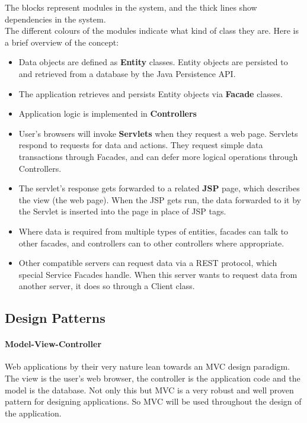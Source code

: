 The blocks represent modules in the system, and the thick lines show dependencies in the system.\\
The different colours of the modules indicate what kind of class they are.
Here is a brief overview of the concept:
\begin{itemize}
\item Data objects are defined as \textbf{Entity} classes. Entity objects are persisted to and retrieved from a database by the Java Persistence API.
\item The application retrieves and persists Entity objects via \textbf{Facade} classes.
\item Application logic is implemented in \textbf{Controllers}
\item User's browsers will invoke \textbf{Servlets} when they request a web page. Servlets respond to requests for data and actions. They request simple data transactions through Facades, and can defer more logical operations through Controllers.
\item The servlet's response gets forwarded to a related \textbf{JSP} page, which describes the view (the web page). When the JSP gets run, the data forwarded to it by the Servlet is inserted into the page in place of JSP tags.
\item Where data is required from multiple types of entities, facades can talk to other facades, and controllers can to other controllers where appropriate.
\item Other compatible servers can request data via a REST protocol, which special Service Facades handle. When this server wants to request data from another server, it does so through a Client class.
\end{itemize}

\clearpage
\subsection{Design Patterns}

\paragraph{Model-View-Controller}
Web applications by their very nature lean towards an MVC design paradigm. The view is the user's web browser, the controller is the application code and the model is the database. Not only this but MVC is a very robust and well proven pattern for designing applications. So MVC will be used throughout the design of the application.\\

